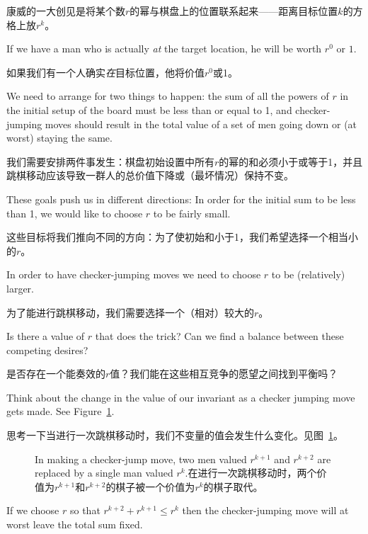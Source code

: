 康威的一大创见是将某个数$r$的幂与棋盘上的位置联系起来——距离目标位置$k$的方格上放$r^k$。

If we have a man who is actually {\em at}
the target location, he will be worth $r^0$ or $1$.

如果我们有一个人确实\emph{在}目标位置，他将价值$r^0$或1。

We need to arrange for
two things to happen:  the sum of all the powers of $r$ in the initial setup
of the board must be less than or equal to 1, and checker-jumping moves should
result in the total value of a set of men going down or (at worst) staying 
the same.

我们需要安排两件事发生：棋盘初始设置中所有$r$的幂的和必须小于或等于1，并且跳棋移动应该导致一群人的总价值下降或（最坏情况）保持不变。

These goals push us in different directions:  In order for the initial sum to be less
than 1, we would like to choose $r$ to be fairly small.

这些目标将我们推向不同的方向：为了使初始和小于1，我们希望选择一个相当小的$r$。

In order to have checker-jumping moves we need to choose $r$ to be (relatively) larger.

为了能进行跳棋移动，我们需要选择一个（相对）较大的$r$。

Is there a value of $r$ that does the trick?  Can we find a balance between these competing 
desires?

是否存在一个能奏效的$r$值？我们能在这些相互竞争的愿望之间找到平衡吗？

Think about the change in the value of our invariant as a checker jumping 
move gets made.  See Figure~\ref{fig:finding_r}.

思考一下当进行一次跳棋移动时，我们不变量的值会发生什么变化。见图~\ref{fig:finding_r}。

\begin{figure}[!hbtp] 
\begin{center}

\end{center}
\caption[Finding $r$.寻找r。]{In making a checker-jump move, two men valued $r^{k+1}$ and $r^{k+2}$ are replaced by a single man valued $r^k$.在进行一次跳棋移动时，两个价值为$r^{k+1}$和$r^{k+2}$的棋子被一个价值为$r^k$的棋子取代。}
\label{fig:finding_r}
\end{figure}
 
If we choose $r$ so that $r^{k+2} + r^{k+1} \leq r^k$ then the 
checker-jumping move will at worst leave the total sum fixed.


